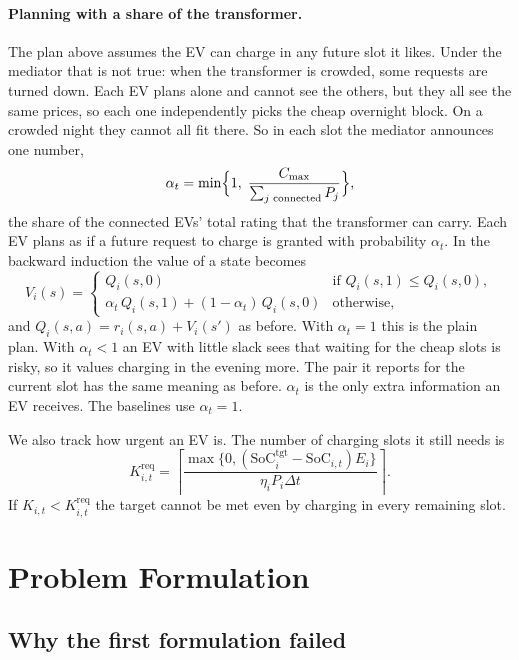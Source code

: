 \documentclass{article}
\newcommand{\soc}{\mathrm{SoC}}
\newcommand{\cmax}{C_{\max}}
\newcommand{\dt}{\Delta t}
\begin{document}
\paragraph{Planning with a share of the transformer.}\label{sec:prelim-alpha} The plan above assumes the EV can charge in any future slot it likes. Under the mediator that is not true: when the transformer is crowded, some requests are turned down. Each EV plans alone and cannot see the others, but they all see the same prices, so each one independently picks the cheap overnight block. On a crowded night they cannot all fit there. So in each slot the mediator announces one number,
\begin{equation}
\alpha_t = \min\Bigl\{1,\; \frac{\cmax}{\sum_{j \text{ connected}} P_j}\Bigr\},
\end{equation}
the share of the connected EVs' total rating that the transformer can carry. Each EV plans as if a future request to charge is granted with probability $\alpha_t$. In the backward induction the value of a state becomes
\begin{equation}
V_i(s) = \begin{cases} Q_i(s,0) & \text{if } Q_i(s,1) \le Q_i(s,0),\\ \alpha_t\, Q_i(s,1) + (1-\alpha_t)\, Q_i(s,0) & \text{otherwise,} \end{cases}
\end{equation}
and $Q_i(s,a) = r_i(s,a) + V_i(s')$ as before. With $\alpha_t = 1$ this is the plain plan. With $\alpha_t < 1$ an EV with little slack sees that waiting for the cheap slots is risky, so it values charging in the evening more. The pair it reports for the current slot has the same meaning as before. $\alpha_t$ is the only extra information an EV receives. The baselines use $\alpha_t = 1$.

We also track how urgent an EV is. The number of charging slots it still needs is
\begin{equation}
K^{\mathrm{req}}_{i,t} = \left\lceil \frac{\max\{0, (\soc^{\mathrm{tgt}}_i - \soc_{i,t})E_i\}}{\eta_i P_i \dt} \right\rceil .
\end{equation}
If $K_{i,t} < K^{\mathrm{req}}_{i,t}$ the target cannot be met even by charging in every remaining slot.

\section{Problem Formulation}

\subsection{Why the first formulation failed}
\end{document}
